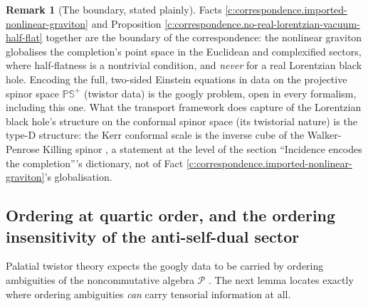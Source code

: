 \documentclass[11pt]{article}
\theoremstyle{definition}
\newtheorem{remark}[theorem]{Remark}
\theoremstyle{plain}
\newcommand{\changedmark}[2]{\marginpar{\raggedright\scriptsize\color{#1}#2}}
\providecommand{\PCS}{}\renewcommand{\PCS}{\mathbb{P}{\mathbb{S}^{+}}}
\begin{document}
\begin{remark}[The boundary, stated plainly]\label{c:note.correspondence.boundary-stated-plainly}
\changedmark{gray}{reworded}
Facts \ref{c:correspondence.imported-nonlinear-graviton} and Proposition \ref{c:correspondence.no-real-lorentzian-vacuum-half-flat} together are the boundary of the correspondence: the nonlinear graviton globalises the completion's point space in the Euclidean and complexified sectors, where half-flatness is a nontrivial condition, and \emph{never} for a real Lorentzian black hole. Encoding the full, two-sided Einstein equations in data on the projective spinor space $\PCS$ (twistor data) is the googly problem, open in every formalism, including this one. What the transport framework does capture of the Lorentzian black hole's structure on the conformal spinor space (its twistorial nature) is the type-D structure: the Kerr conformal scale is the inverse cube of the Walker-Penrose Killing spinor \cite[Prop.~6.8]{ButlerT6}, a statement at the level of the section ``Incidence encodes the completion'''s dictionary, not of Fact \ref{c:correspondence.imported-nonlinear-graviton}'s globalisation.
\end{remark}

\subsection*{Ordering at quartic order, and the ordering insensitivity of the anti-self-dual sector}
\label{c:note.correspondence.setting-ordering-quartic-order-ordering-insensitivity}
Palatial twistor theory expects the googly data to be carried by ordering ambiguities of the noncommutative algebra $\mathcal{P}$ \cite{Penrose15}. The next lemma locates exactly where ordering ambiguities \emph{can} carry tensorial information at all.
\end{document}
